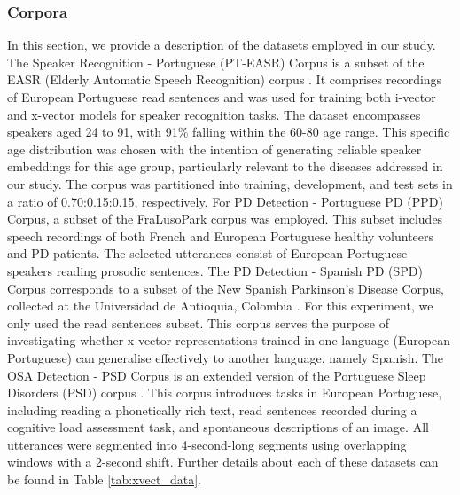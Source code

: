 \subsubsection{Corpora}
In this section, we provide a description of the datasets employed in our study.
The Speaker Recognition - Portuguese (PT-EASR) Corpus is a subset of the EASR (Elderly Automatic Speech Recognition) corpus \cite{hamalainen2014easr}. It comprises recordings of European Portuguese read sentences and was used for training both i-vector and x-vector models for speaker recognition tasks. The dataset encompasses speakers aged 24 to 91, with 91\% falling within the 60-80 age range. This specific age distribution was chosen with the intention of generating reliable speaker embeddings for this age group, particularly relevant to the diseases addressed in our study. The corpus was partitioned into training, development, and test sets in a ratio of 0.70:0.15:0.15, respectively.
For PD Detection - Portuguese PD (PPD) Corpus, a subset of the FraLusoPark corpus \cite{pinto2016dysarthria} was employed. This subset includes speech recordings of both French and European Portuguese healthy volunteers and PD patients. The selected utterances consist of European Portuguese speakers reading prosodic sentences.
The PD Detection - Spanish PD (SPD) Corpus corresponds to a subset of the New Spanish Parkinson’s Disease Corpus, collected at the Universidad de Antioquia, Colombia \cite{orozco2014new}. For this experiment, we only used the read sentences subset. This corpus serves the purpose of investigating whether x-vector representations trained in one language (European Portuguese) can generalise effectively to another language, namely Spanish.
The OSA Detection - PSD Corpus is an extended version of the Portuguese Sleep Disorders (PSD) corpus \cite{botelho2019speech}. This corpus introduces tasks in European Portuguese, including reading a phonetically rich text, read sentences recorded during a cognitive load assessment task, and spontaneous descriptions of an image. All utterances were segmented into 4-second-long segments using overlapping windows with a 2-second shift. Further details about each of these datasets can be found in Table \ref{tab:xvect_data}.
